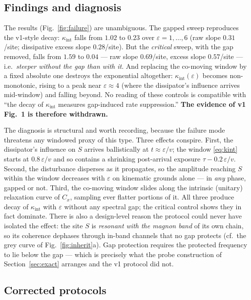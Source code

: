 \documentclass[11pt,a4paper]{article}
\theoremstyle{remark}
\newcommand{\eps}{\varepsilon}
\begin{document}
\subsection{Findings and diagnosis}

The results (Fig.~\ref{fig:failure}) are unambiguous. The gapped sweep reproduces the
v1-style decay: $\kappa_{\mathrm{int}}$ falls from $1.02$ to $0.23$ over
$\eps = 1,\dots,6$ (raw slope $0.31$/site; dissipative excess slope $0.28$/site). But the
\emph{critical} sweep, with the gap removed, falls from $1.59$ to $0.04$ --- raw slope
$0.69$/site, excess slope $0.57$/site --- i.e.\ \emph{steeper without the gap than with
it}. And replacing the co-moving window by a fixed absolute one destroys the exponential
altogether: $\kappa_{\mathrm{int}}(\eps)$ becomes non-monotonic, rising to a peak near
$\eps \approx 4$ (where the dissipator's influence arrives mid-window) and falling
beyond. No reading of these controls is compatible with ``the decay of
$\kappa_{\mathrm{int}}$ measures gap-induced rate suppression.'' \textbf{The evidence of
v1 Fig.~1 is therefore withdrawn.}

The diagnosis is structural and worth recording, because the failure mode threatens any
windowed proxy of this type. Three effects conspire. First, the dissipator's influence on
$S$ arrives ballistically at $t \approx \eps/v$; the window \eqref{eq:kint} starts at
$0.8\,\eps/v$ and so contains a shrinking post-arrival exposure $\tau - 0.2\,\eps/v$.
Second, the disturbance disperses as it propagates, so the amplitude reaching $S$ within
the window decreases with $\eps$ on kinematic grounds alone --- in \emph{any} phase,
gapped or not. Third, the co-moving window slides along the intrinsic (unitary) relaxation
curve of $C_x$, sampling ever flatter portions of it. All three produce decay of
$\kappa_{\mathrm{int}}$ with $\eps$ without any spectral gap; the critical control shows
they in fact dominate. There is also a design-level reason the protocol could never have
isolated the effect: the site $S$ is \emph{resonant with the magnon band} of its own
chain, so its coherence dephases through in-band channels that no gap protects
(cf.\ the grey curve of Fig.~\ref{fig:inherit}a). Gap protection requires the protected
frequency to lie below the gap --- which is precisely what the probe construction of
Section~\ref{sec:exact} arranges and the v1 protocol did not.

\subsection{Corrected protocols}
\end{document}

